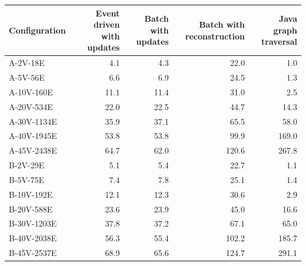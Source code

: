 \begin{tabular}{@{}lrrrr@{}}
\toprule
Configuration & Event driven with updates & Batch with updates & Batch with reconstruction & Java graph traversal \\
\midrule
A-2V-18E & 4.1 & 4.3 & 22.0 & 1.0 \\
A-5V-56E & 6.6 & 6.9 & 24.5 & 1.3 \\
A-10V-160E & 11.1 & 11.4 & 31.0 & 2.5 \\
A-20V-534E & 22.0 & 22.5 & 44.7 & 14.3 \\
A-30V-1134E & 35.9 & 37.1 & 65.5 & 58.0 \\
A-40V-1945E & 53.8 & 53.8 & 99.9 & 169.0 \\
A-45V-2438E & 64.7 & 62.0 & 120.6 & 267.8 \\
B-2V-29E & 5.1 & 5.4 & 22.7 & 1.1 \\
B-5V-75E & 7.4 & 7.8 & 25.1 & 1.4 \\
B-10V-192E & 12.1 & 12.3 & 30.6 & 2.9 \\
B-20V-588E & 23.6 & 23.9 & 45.0 & 16.6 \\
B-30V-1203E & 37.8 & 37.2 & 67.1 & 65.0 \\
B-40V-2038E & 56.3 & 55.4 & 102.2 & 185.7 \\
B-45V-2537E & 68.9 & 65.6 & 124.7 & 291.1 \\
\bottomrule
\end{tabular}
